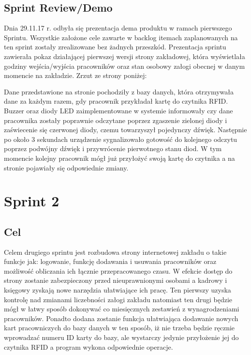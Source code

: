\documentclass[a4paper]{article}
\begin{document}
\subsection{Sprint Review/Demo}

Dnia 29.11.17 r. odbyła się prezentacja dema produktu w ramach pierwszego Sprintu. Wszystkie założone cele zawarte w backlog itemach zaplanowanych na ten sprint zostały zrealizowane bez żadnych przeszkód. Prezentacja sprintu zawierała pokaz działającej pierwszej wersji strony zakładowej, która wyświetlała godziny wejścia/wyjścia pracowników oraz stan osobowy załogi obecnej w danym momencie na zakładzie.    
Zrzut ze strony poniżej:
\begin{figure}[!htbp]
\end{figure}

Dane przedstawione na stronie pochodziły z bazy danych, która otrzymywała dane za każdym razem, gdy pracownik przykładał kartę do czytnika RFID. Buzzer oraz diody LED  zaimplementowane w systemie informowały czy dane pracownika zostały poprawnie odczytane  poprzez zgaszenie  zielonej diody i zaświecenie się czerwonej diody, czemu towarzyszył pojedynczy dźwięk. Następnie po około 3 sekundach urządzenie sygnalizowało gotowość do kolejnego odczytu poprzez podwójny dźwięk i przywrócenie pierwotnego stanu diod. W tym momencie kolejny pracownik mógł już przyłożyć swoją kartę do czytnika a na stronie pojawiały się odpowiednie zmiany.

\section{Sprint 2}

\subsection{Cel} Celem drugiego sprintu jest rozbudowa strony internetowej zakładu o takie funkcje jak: logowanie, funkcję dodawania i usuwania pracowników oraz możliwość obliczania ich łącznie przepracowanego czasu. W efekcie dostęp do strony zostanie zabezpieczony przed nieuprawnionymi osobami a kadrowy i księgowy zyskają nowe narzędzia ułatwiające ich pracę. Ten pierwszy uzyska kontrolę nad zmianami liczebności załogi zakładu natomiast ten drugi będzie mógł w łatwy sposób dokonywać co miesięcznych zestawień z wynagrodzeniami pracowników. Ponadto dodana zostanie funkcja ułatwiająca dodawanie nowych kart pracowniczych do bazy danych w ten sposób, iż nie trzeba będzie ręcznie wprowadzać numeru ID karty do bazy, ale wystarczy jedynie przyłożenie jej do czytnika RFID a program wykona odpowiednie operacje.
\end{document}
